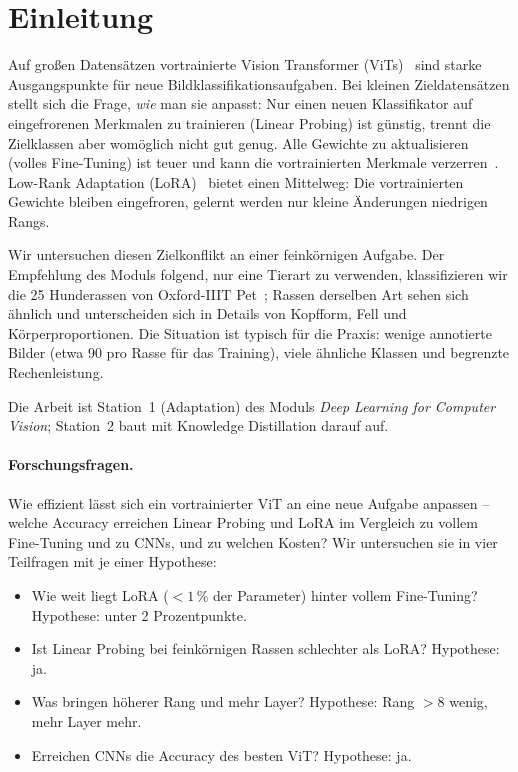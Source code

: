 \section{Einleitung}
\label{sec:intro}

Auf großen Datensätzen vortrainierte Vision Transformer (ViTs)~\cite{dosovitskiy2021vit} sind starke
Ausgangspunkte für neue Bildklassifikationsaufgaben. Bei kleinen Zieldatensätzen stellt sich die Frage,
\emph{wie} man sie anpasst: Nur einen neuen Klassifikator auf eingefrorenen Merkmalen zu trainieren
(Linear Probing) ist günstig, trennt die Zielklassen aber womöglich nicht gut genug. Alle Gewichte zu
aktualisieren (volles Fine-Tuning) ist teuer und kann die vortrainierten Merkmale
verzerren~\cite{kumar2022finetuning}. Low-Rank Adaptation (LoRA)~\cite{hu2022lora} bietet einen
Mittelweg: Die vortrainierten Gewichte bleiben eingefroren, gelernt werden nur kleine Änderungen niedrigen
Rangs.

Wir untersuchen diesen Zielkonflikt an einer feinkörnigen Aufgabe. Der Empfehlung des Moduls folgend, nur eine
Tierart zu verwenden, klassifizieren wir die 25 Hunderassen von Oxford-IIIT Pet~\cite{parkhi2012pets};
Rassen derselben Art sehen sich ähnlich und unterscheiden sich in Details von Kopfform, Fell und
Körperproportionen. Die Situation ist typisch für die Praxis: wenige annotierte Bilder (etwa 90 pro
Rasse für das Training), viele ähnliche Klassen und begrenzte Rechenleistung.

Die Arbeit ist Station~1 (Adaptation) des Moduls \emph{Deep Learning for Computer Vision}; Station~2
baut mit Knowledge Distillation darauf auf.

\paragraph{Forschungsfragen.}
Wie effizient lässt sich ein vortrainierter ViT an eine neue Aufgabe anpassen -- welche Accuracy
erreichen Linear Probing und LoRA im Vergleich zu vollem Fine-Tuning und zu CNNs, und zu welchen Kosten?
Wir untersuchen sie in vier Teilfragen mit je einer Hypothese:
\begin{itemize}\itemsep0pt
  \item[\textbf{Q1}] Wie weit liegt LoRA ($<1\,\%$ der Parameter) hinter vollem Fine-Tuning?
        Hypothese: unter 2 Prozentpunkte.
  \item[\textbf{Q2}] Ist Linear Probing bei feinkörnigen Rassen schlechter als LoRA? Hypothese: ja.
  \item[\textbf{Q3}] Was bringen höherer Rang und mehr Layer? Hypothese: Rang $>8$ wenig, mehr Layer mehr.
  \item[\textbf{Q4}] Erreichen CNNs die Accuracy des besten ViT? Hypothese: ja.
\end{itemize}
